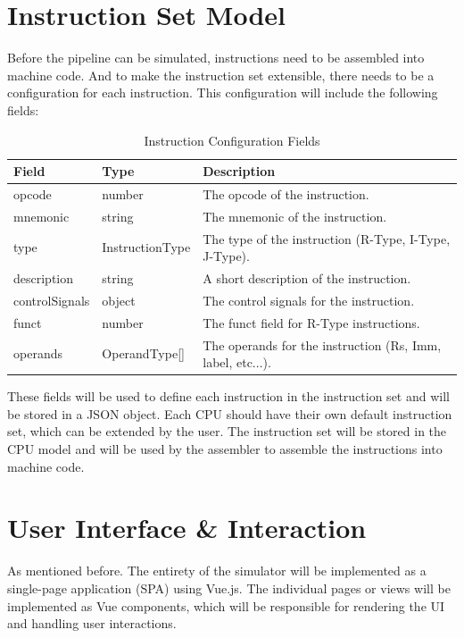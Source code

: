 \section{Instruction Set Model}
Before the pipeline can be simulated, instructions need to be assembled into machine code. And to make the instruction set extensible, there needs to be a configuration for each instruction. This configuration will include the following fields:
\begin{table}[H]
    \centering
    \begin{tabular}{|l|l|l|}
        \hline
        \textbf{Field} & \textbf{Type} & \textbf{Description} \\ \hline
        opcode & number & The opcode of the instruction. \\ \hline
        mnemonic & string & The mnemonic of the instruction. \\ \hline
        type & InstructionType & The type of the instruction (R-Type, I-Type, J-Type). \\ \hline
        description & string & A short description of the instruction. \\ \hline
        controlSignals & object & The control signals for the instruction. \\ \hline
        funct & number & The funct field for R-Type instructions. \\ \hline
        operands & OperandType[] & The operands for the instruction (Rs, Imm, label, etc...). \\ \hline
    \end{tabular}
    \caption{Instruction Configuration Fields}
    \label{tab:instruction_config}
\end{table}

These fields will be used to define each instruction in the instruction set and will be stored in a JSON object. Each CPU should have their own default instruction set, which can be extended by the user. The instruction set will be stored in the CPU model and will be used by the assembler to assemble the instructions into machine code.

\section{User Interface \& Interaction}

As mentioned before. The entirety of the simulator will be implemented as a single-page application (SPA) using Vue.js. The individual pages or views will be implemented as Vue components, which will be responsible for rendering the UI and handling user interactions. 

